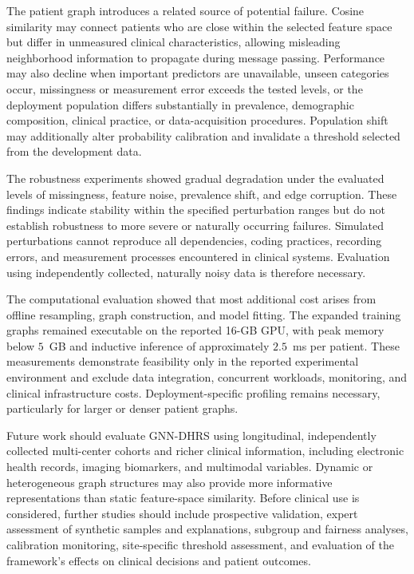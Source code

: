 \documentclass[pdflatex,sn-mathphys-num]{sn-jnl}%
\theoremstyle{thmstyleone}%
\theoremstyle{thmstyletwo}%
\theoremstyle{thmstylethree}%
\begin{document}
{ {
The patient graph introduces a related source of potential failure. Cosine
similarity may connect patients who are close within the selected feature
space but differ in unmeasured clinical characteristics, allowing misleading
neighborhood information to propagate during message passing. Performance may
also decline when important predictors are unavailable, unseen categories
occur, missingness or measurement error exceeds the tested levels, or the
deployment population differs substantially in prevalence, demographic
composition, clinical practice, or data-acquisition procedures. Population
shift may additionally alter probability calibration and invalidate a
threshold selected from the development data.
}

 {
The robustness experiments showed gradual degradation under the evaluated
levels of missingness, feature noise, prevalence shift, and edge corruption.
These findings indicate stability within the specified perturbation ranges but
do not establish robustness to more severe or naturally occurring failures.
Simulated perturbations cannot reproduce all dependencies, coding practices,
recording errors, and measurement processes encountered in clinical systems.
Evaluation using independently collected, naturally noisy data is therefore
necessary.
}

 {
The computational evaluation showed that most additional cost arises from
offline resampling, graph construction, and model fitting. The expanded
training graphs remained executable on the reported 16-GB GPU, with peak
memory below \(5\)~GB and inductive inference of approximately
\(2.5\)~ms per patient. These measurements demonstrate feasibility only in
the reported experimental environment and exclude data integration,
concurrent workloads, monitoring, and clinical infrastructure costs.
Deployment-specific profiling remains necessary, particularly for larger or
denser patient graphs.
}

Future work should evaluate GNN-DHRS using longitudinal, independently
collected multi-center cohorts and richer clinical information, including
electronic health records, imaging biomarkers, and multimodal variables.
Dynamic or heterogeneous graph structures may also provide more informative
representations than static feature-space similarity.
 {
Before clinical use is considered, further studies should include prospective
validation, expert assessment of synthetic samples and explanations, subgroup
and fairness analyses, calibration monitoring, site-specific threshold
assessment, and evaluation of the framework's effects on clinical decisions
and patient outcomes.
}
}
\end{document}
